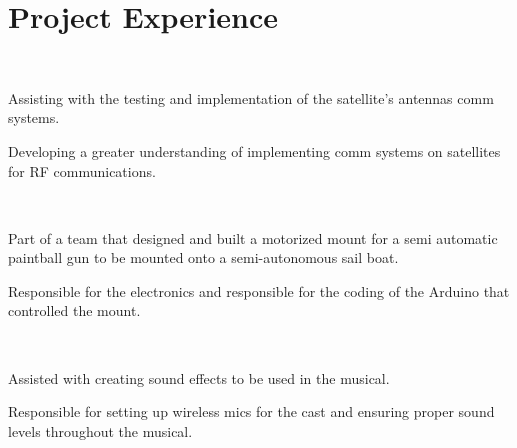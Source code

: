 \documentclass[]{hieudo-build}
\begin{document}
\hfill
\begin{minipage}[t]{0.65\textwidth} 

\section{Project Experience}

\\
\vspace{0.9em} %
\begin{tightemize}
\item Assisting with the testing and implementation of the satellite’s antennas comm systems.
\item Developing a greater understanding of implementing comm systems on satellites for RF communications.
\end{tightemize}
\sectionsep

 \\
\begin{tightemize}
\item Part of a team that designed and built a motorized mount for a semi automatic paintball gun to be mounted onto a semi-autonomous sail boat.
\item Responsible for the electronics and responsible for the coding of the Arduino that controlled the mount.
\end{tightemize}
\sectionsep

 \\
\begin{tightemize}
\item Assisted with creating sound effects to be used in the musical.
\item Responsible for setting up wireless mics for the cast and ensuring proper sound levels throughout the musical.
\end{tightemize}
\sectionsep



\end{minipage}
\end{document}
